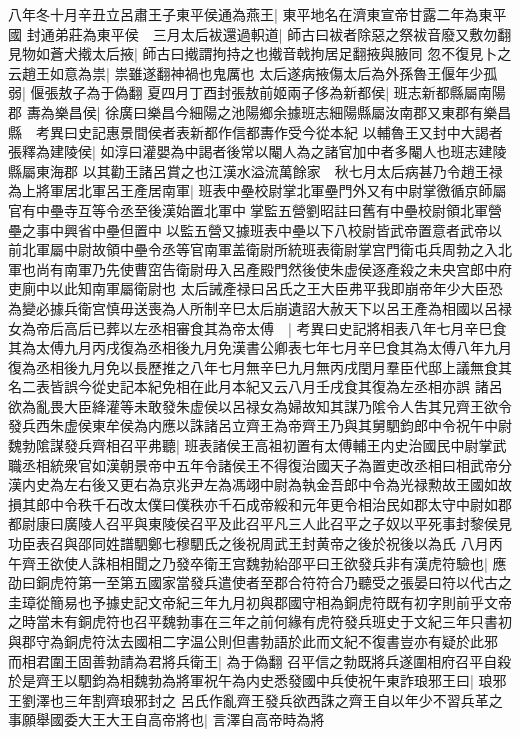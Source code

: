 八年冬十月辛丑立呂肅王子東平侯通為燕王|{
	東平地名在濟東宣帝甘露二年為東平國}
封通弟莊為東平侯　三月太后袚還過軹道|{
	師古曰袚者除惡之祭袚音廢又敷勿翻}
見物如蒼犬撠太后掖|{
	師古曰撠謂拘持之也撠音戟拘居足翻掖與腋同}
忽不復見卜之云趙王如意為祟|{
	祟雖遂翻神禍也鬼厲也}
太后遂病掖傷太后為外孫魯王偃年少孤弱|{
	偃張敖子為于偽翻}
夏四月丁酉封張敖前姬兩子侈為新都侯|{
	班志新都縣屬南陽郡}
夀為樂昌侯|{
	徐廣曰樂昌今細陽之池陽鄉余據班志細陽縣屬汝南郡又東郡有樂昌縣　考異曰史記惠景間侯者表新都作信都夀作受今從本紀}
以輔魯王又封中大謁者張釋為建陵侯|{
	如淳曰灌嬰為中謁者後常以閹人為之諸官加中者多閹人也班志建陵縣屬東海郡}
以其勸王諸呂賞之也江漢水溢流萬餘家　秋七月太后病甚乃令趙王禄為上將軍居北軍呂王產居南軍|{
	班表中壘校尉掌北軍壘門外又有中尉掌徼循京師屬官有中壘寺互等令丞至後漢始置北軍中掌監五營劉昭註曰舊有中壘校尉領北軍營壘之事中興省中壘但置中以監五營又據班表中壘以下八校尉皆武帝置意者武帝以前北軍屬中尉故領中壘令丞等官南軍盖衛尉所統班表衛尉掌宫門衛屯兵周勃之入北軍也尚有南軍乃先使曹窋告衛尉毋入呂產殿門然後使朱虚侯逐產殺之未央宫郎中府吏廁中以此知南軍屬衛尉也}
太后誡產禄曰呂氏之王大臣弗平我即崩帝年少大臣恐為變必據兵衛宫慎毋送喪為人所制辛巳太后崩遺詔大赦天下以呂王產為相國以呂禄女為帝后高后已葬以左丞相審食其為帝太傅　|{
	考異曰史記將相表八年七月辛巳食其為太傅九月丙戌復為丞相後九月免漢書公卿表七年七月辛巳食其為太傅八年九月復為丞相後九月免以長歷推之八年七月無辛巳九月無丙戌閏月羣臣代邸上議無食其名二表皆誤今從史記本紀免相在此月本紀又云八月壬戌食其復為左丞相亦誤}
諸呂欲為亂畏大臣絳灌等未敢發朱虚侯以呂禄女為婦故知其謀乃隂令人吿其兄齊王欲令發兵西朱虚侯東牟侯為内應以誅諸呂立齊王為帝齊王乃與其舅駟鈞郎中令祝午中尉魏勃隂謀發兵齊相召平弗聽|{
	班表諸侯王高祖初置有太傅輔王内史治國民中尉掌武職丞相統衆官如漢朝景帝中五年令諸侯王不得復治國天子為置吏改丞相曰相武帝分漢内史為左右後又更右為京兆尹左為馮翊中尉為執金吾郎中令為光禄勲故王國如故損其郎中令秩千石改太僕曰僕秩亦千石成帝綏和元年更令相治民如郡太守中尉如郡都尉康曰廣陵人召平與東陵侯召平及此召平凡三人此召平之子奴以平死事封黎侯見功臣表召與邵同姓譜駟鄭七穆駟氏之後祝周武王封黄帝之後於祝後以為氏}
八月丙午齊王欲使人誅相相聞之乃發卒衛王宫魏勃紿邵平曰王欲發兵非有漢虎符驗也|{
	應劭曰銅虎符第一至第五國家當發兵遣使者至郡合符符合乃聽受之張晏曰符以代古之圭璋從簡易也予據史記文帝紀三年九月初與郡國守相為銅虎符既有初字則前乎文帝之時當未有銅虎符也召平魏勃事在三年之前何緣有虎符發兵班史于文紀三年只書初與郡守為銅虎符汰去國相二字温公則但書勃語於此而文紀不復書豈亦有疑於此邪}
而相君圍王固善勃請為君將兵衛王|{
	為于偽翻}
召平信之勃既將兵遂圍相府召平自殺於是齊王以駟鈞為相魏勃為將軍祝午為内史悉發國中兵使祝午東詐琅邪王曰|{
	琅邪王劉澤也三年割齊琅邪封之}
呂氏作亂齊王發兵欲西誅之齊王自以年少不習兵革之事願舉國委大王大王自高帝將也|{
	言澤自高帝時為將}
